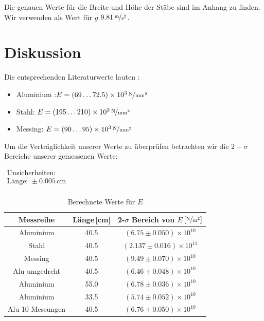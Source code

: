 \documentclass[11pt,a4paper]{article}
\begin{document}
Die genauen Werte f\"ur die Breite und H\"ohe der St\"abe sind im Anhang zu finden. Wir verwenden als Wert f\"ur $g$ $9.81\,\nicefrac{\mathrm{m}}{\mathrm{s}^2}$.

\pagebreak

\section{Diskussion}

Die entsprechenden Literaturwerte lauten \cite{Anleitung}:

\begin{itemize}
\item Aluminium :$E=(69\ldots72.5)\times10^3\,\nicefrac{\mathrm{N}}{\mathrm{mm^2}}$
\item Stahl: $E=(195\ldots210)\times10^3\,\nicefrac{\mathrm{N}}{\mathrm{mm^2}}$
\item Messing: $E=(90\ldots95)\times10^3\,\nicefrac{\mathrm{N}}{\mathrm{mm^2}}$
\end{itemize}

Um die Vertr\"aglichkeit unserer Werte zu \"uberpr\"ufen betrachten wir die $2-\sigma$ Bereiche unserer gemessenen Werte:

\begin{table}[h]
\centering
\caption{Berechnete Werte f\"ur $E$} \vspace{11pt}
$\begin{array}{l}
\textrm{Unsicherheiten:}\\
\textrm{L\"ange: } \pm 0.005\,\textrm{cm}\\
\end{array}$
\begin{tabular}{ccc}
\toprule
\textrm{Messreihe} & \textrm{L\"ange}\,[\textrm{cm}] & \textrm{2-}$\sigma$\textrm{ Bereich von }$E$\,$\left[\nicefrac{\mathrm{N}}{\mathrm{m^2}}\right]$ \\
\midrule 
\textrm{Aluminium} & 40.5 & $(6.75\pm0.050)\times10^{10}$ \\
\textrm{Stahl} & 40.5 & $(2.137\pm0.016)\times10^{11}$ \\
\textrm{Messing} & 40.5 & $(9.49\pm0.070)\times10^{10}$ \\
\hline
\textrm{Alu umgedreht} & 40.5 & $(6.46\pm0.048)\times10^{10}$ \\
\textrm{Aluminium} & 55.0 & $(6.78\pm0.036)\times10^{10}$ \\ 
\textrm{Aluminium} & 33.5 & $(5.74\pm0.052)\times10^{10}$ \\ 
\textrm{Alu 10 Messungen} & 40.5 & $(6.76\pm0.050)\times10^{10}$ \\ 
\bottomrule
\end{tabular}
\label{Tab:1}
\end{table}
\end{document}
